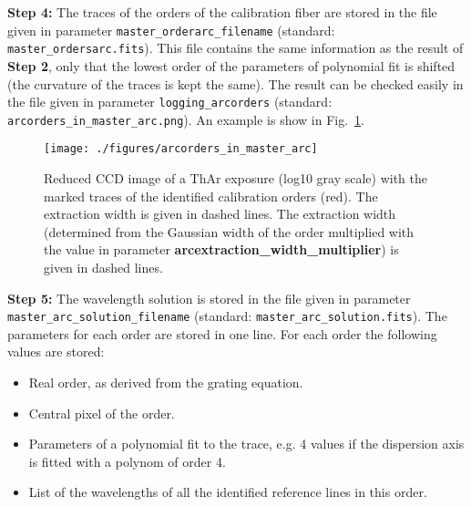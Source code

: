 \documentclass[10pt,a4paper]{article}
\begin{document}
\vspace{0.5em}\noindent \textbf{Step 4:} The traces of the orders of the calibration fiber are stored in the file given in parameter \verb|master_orderarc_filename| (standard: \verb|master_ordersarc.fits|). This file contains the same information as the result of \textbf{Step 2}, only that the lowest order of the parameters of polynomial fit is shifted (the curvature of the traces is kept the same). The result can be checked easily in the file given in parameter \verb|logging_arcorders| (standard: \verb|arcorders_in_master_arc.png|). An example is show in Fig.~\ref{figure_arcorders_in_master_arc}.

\begin{figure} 
  \begin{center}
    \texttt{[image: ./figures/arcorders\_in\_master\_arc]}
  \end{center} 
  \caption{Reduced CCD image of a ThAr exposure (log10 gray scale) with the marked traces of the identified calibration orders (red). The extraction width is given in dashed lines. The extraction width (determined from the Gaussian width of the order multiplied with the value in parameter \textbf{arcextraction\_width\_multiplier}) is given in dashed lines.
    \label{figure_arcorders_in_master_arc}}
\end{figure}


\vspace{0.5em}\noindent \textbf{Step 5:} The wavelength solution is stored in the file given in parameter \verb|master_arc_solution_filename| (standard: \verb|master_arc_solution.fits|). The parameters for each order are stored in one line. For each order the following values are stored:
\begin{itemize}
  \item Real order, as derived from the grating equation.
  \item Central pixel of the order.
  \item Parameters of a polynomial fit to the trace, e.g. 4 values if the dispersion axis is fitted with a polynom of order 4.
  \item List of the wavelengths of all the identified reference lines in this order.
\end{itemize}
\end{document}
